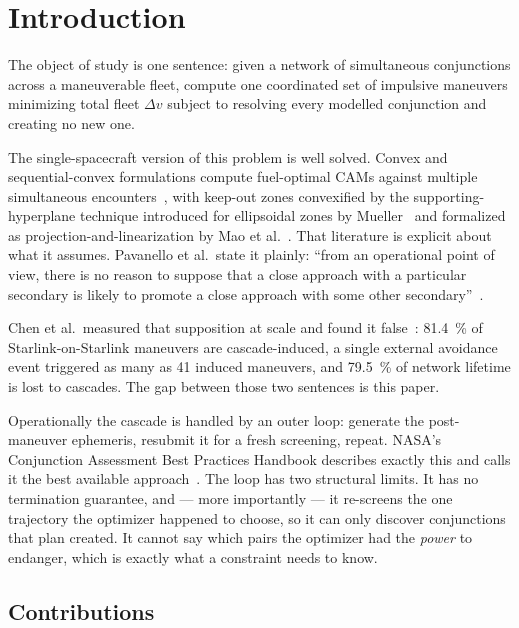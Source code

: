 \documentclass[11pt]{article}
\theoremstyle{definition}
\theoremstyle{remark}
\newcommand{\dv}{\Delta v}
\begin{document}
\section{Introduction}

The object of study is one sentence: given a network of simultaneous
conjunctions across a maneuverable fleet, compute one coordinated set of
impulsive maneuvers minimizing total fleet $\dv$ subject to resolving every
modelled conjunction and creating no new one.

The single-spacecraft version of this problem is well solved. Convex and
sequential-convex formulations compute fuel-optimal CAMs against multiple
simultaneous encounters~\cite{armellin2021,pavanello2024}, with keep-out zones
convexified by the supporting-hyperplane technique introduced for ellipsoidal
zones by Mueller~\cite{mueller2009} and formalized as projection-and-lin\-ear\-i\-za\-tion
by Mao et al.~\cite{mao2017}. That literature is explicit about what it
assumes. Pavanello et al.\ state it plainly: ``from an operational point of
view, there is no reason to suppose that a close approach with a particular
secondary is likely to promote a close approach with some other
secondary''~\cite{pavanello2024}.

Chen et al.\ measured that supposition at scale and found it
false~\cite{chen2024}: \SI{81.4}{\percent} of Starlink-on-Starlink maneuvers
are cascade-induced, a single external avoidance event triggered as many as 41
induced maneuvers, and \SI{79.5}{\percent} of network lifetime is lost to
cascades. The gap between those two sentences is this paper.

Operationally the cascade is handled by an outer loop: generate the
post-maneuver ephemeris, resubmit it for a fresh screening, repeat. NASA's
Conjunction Assessment Best Practices Handbook describes exactly this and calls
it the best available approach~\cite{nasa2023}. The loop has two structural
limits. It has no termination guarantee, and --- more importantly --- it
re-screens the one trajectory the optimizer happened to choose, so it can only
discover conjunctions that plan created. It cannot say which pairs the
optimizer had the \emph{power} to endanger, which is exactly what a constraint
needs to know.

\subsection{Contributions}
\end{document}

